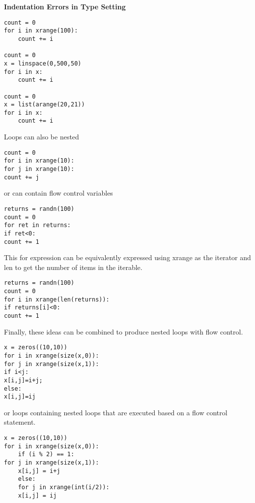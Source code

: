 \documentclass[KSmain.tex]{subfiles}
\begin{document}
\textbf{Indentation Errors in Type Setting}
\begin{framed}
\begin{verbatim}
count = 0
for i in xrange(100):
	count += i

count = 0
x = linspace(0,500,50)
for i in x:
	count += i

count = 0
x = list(arange(20,21))
for i in x:
	count += i
\end{verbatim}
\end{framed}
Loops can also be nested
\begin{framed}
	\begin{verbatim}
count = 0
for i in xrange(10):
for j in xrange(10):
count += j
\end{verbatim}
\end{framed}
or can contain flow control variables
\begin{framed}
	\begin{verbatim}
returns = randn(100)
count = 0
for ret in returns:
if ret<0:
count += 1
\end{verbatim}
\end{framed}
This for expression can be equivalently expressed using xrange as the iterator and len to get the number
of items in the iterable.
\begin{framed}
	\begin{verbatim}
returns = randn(100)
count = 0
for i in xrange(len(returns)):
if returns[i]<0:
count += 1
\end{verbatim}
\end{framed}
Finally, these ideas can be combined to produce nested loops with flow control.
\begin{framed}
	\begin{verbatim}
x = zeros((10,10))
for i in xrange(size(x,0)):
for j in xrange(size(x,1)):
if i<j:
x[i,j]=i+j;
else:
x[i,j]=ij
\end{verbatim}
\end{framed}
or loops containing nested loops that are executed based on a flow control statement.
\begin{framed}
	\begin{verbatim}
x = zeros((10,10))
for i in xrange(size(x,0)):
	if (i % 2) == 1:
for j in xrange(size(x,1)):
	x[i,j] = i+j
	else:
	for j in xrange(int(i/2)):
	x[i,j] = ij
\end{verbatim}
\end{framed}
\end{document}
